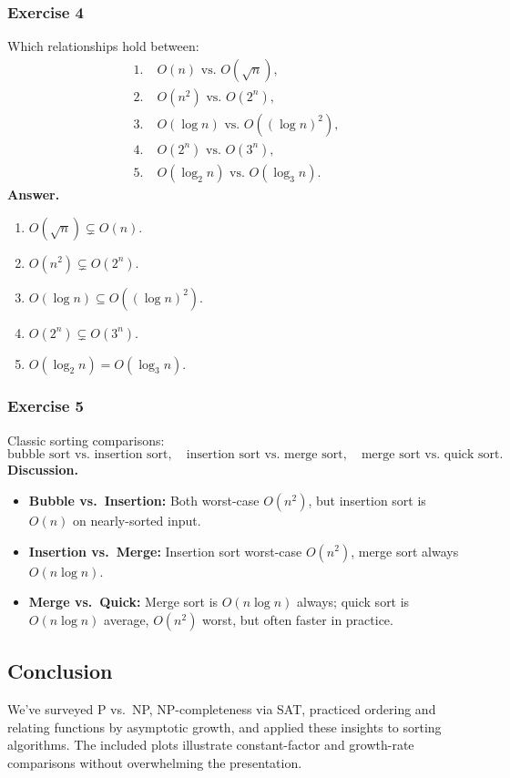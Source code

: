 \documentclass{article}
\theoremstyle{theorem}
\theoremstyle{definition}
\theoremstyle{remark}
\begin{document}
\subsubsection*{Exercise 4}
Which relationships hold between:
\[
\begin{aligned}
1.\;&O(n)\text{ vs.\ }O(\sqrt n),\\
2.\;&O(n^2)\text{ vs.\ }O(2^n),\\
3.\;&O(\log n)\text{ vs.\ }O((\log n)^2),\\
4.\;&O(2^n)\text{ vs.\ }O(3^n),\\
5.\;&O(\log_2n)\text{ vs.\ }O(\log_3n).
\end{aligned}
\]
\textbf{Answer.}
\begin{enumerate}[label=\arabic*.]
  \item \(O(\sqrt n)\subsetneq O(n)\).
  \item \(O(n^2)\subsetneq O(2^n)\).
  \item \(O(\log n)\subseteq O((\log n)^2)\).
  \item \(O(2^n)\subsetneq O(3^n)\).
  \item \(O(\log_2n)=O(\log_3n)\).
\end{enumerate}

\subsubsection*{Exercise 5}
Classic sorting comparisons:
\[
\text{bubble sort vs.\ insertion sort},\quad
\text{insertion sort vs.\ merge sort},\quad
\text{merge sort vs.\ quick sort}.
\]
\textbf{Discussion.}
\begin{itemize}
  \item \textbf{Bubble vs.\ Insertion:} Both worst-case \(O(n^2)\), but insertion sort is \(O(n)\) on nearly-sorted input.
  \item \textbf{Insertion vs.\ Merge:} Insertion sort worst-case \(O(n^2)\), merge sort always \(O(n\log n)\).
  \item \textbf{Merge vs.\ Quick:} Merge sort is \(O(n\log n)\) always; quick sort is \(O(n\log n)\) average, \(O(n^2)\) worst, but often faster in practice.
\end{itemize}

\subsection{Conclusion}
We’ve surveyed P vs.\ NP, NP-completeness via SAT, practiced ordering and relating functions by asymptotic growth, and applied these insights to sorting algorithms. The included plots illustrate constant-factor and growth-rate comparisons without overwhelming the presentation.
\end{document}
